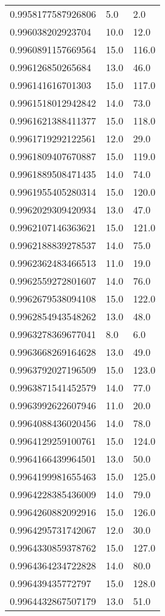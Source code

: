 \begin{center}
\begin{supertabular}[H]{p{0.30\textwidth}p{0.05\textwidth}p{0.05\textwidth}}
0.9958177587926806 & 5.0 & 2.0 \\ 
0.996038202923704 & 10.0 & 12.0 \\ 
0.9960891157669564 & 15.0 & 116.0 \\ 
0.996126850265684 & 13.0 & 46.0 \\ 
0.996141616701303 & 15.0 & 117.0 \\ 
0.9961518012942842 & 14.0 & 73.0 \\ 
0.9961621388411377 & 15.0 & 118.0 \\ 
0.9961719292122561 & 12.0 & 29.0 \\ 
0.9961809407670887 & 15.0 & 119.0 \\ 
0.9961889508471435 & 14.0 & 74.0 \\ 
0.9961955405280314 & 15.0 & 120.0 \\ 
0.9962029309420934 & 13.0 & 47.0 \\ 
0.9962107146363621 & 15.0 & 121.0 \\ 
0.9962188839278537 & 14.0 & 75.0 \\ 
0.9962362483466513 & 11.0 & 19.0 \\ 
0.9962559272801607 & 14.0 & 76.0 \\ 
0.9962679538094108 & 15.0 & 122.0 \\ 
0.9962854943548262 & 13.0 & 48.0 \\ 
0.9963278369677041 & 8.0 & 6.0 \\ 
0.9963668269164628 & 13.0 & 49.0 \\ 
0.9963792027196509 & 15.0 & 123.0 \\ 
0.9963871541452579 & 14.0 & 77.0 \\ 
0.9963992622607946 & 11.0 & 20.0 \\ 
0.9964088436020456 & 14.0 & 78.0 \\ 
0.9964129259100761 & 15.0 & 124.0 \\ 
0.9964166439964501 & 13.0 & 50.0 \\ 
0.9964199981655463 & 15.0 & 125.0 \\ 
0.9964228385436009 & 14.0 & 79.0 \\ 
0.9964260882092916 & 15.0 & 126.0 \\ 
0.9964295731742067 & 12.0 & 30.0 \\ 
0.9964330859378762 & 15.0 & 127.0 \\ 
0.9964364234722828 & 14.0 & 80.0 \\ 
0.996439435772797 & 15.0 & 128.0 \\ 
0.9964432867507179 & 13.0 & 51.0 \\ 

\end{supertabular}
\end{center}
